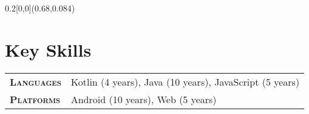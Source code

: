 \documentclass[a4paper, oneside, final]{scrartcl} %
\newcommand{\subSecHeadWidth}{2.1cm}
\begin{document}
\begin{center} %


{\hspace{-3.8cm} \fontsize{34}{34}\selectfont\scshape {\thinfont \myname} {\bodyfont \mysurname}} %

\vspace{1.2cm} %



\begin{textblock}{0.2}[0,0](0.68,0.084)
\begin{flushright}
\end{flushright}
\end{textblock}



\section{Key Skills}

\begin{tabularx}{0.97\linewidth}{>{\raggedleft\scshape}p{\subSecHeadWidth}X}
\textbf{Languages} & Kotlin (4 years), Java (10 years), JavaScript (5 years) \\
\textbf{Platforms} & Android (10 years), Web (5 years) \\
\end{tabularx}


\end{center}
\end{document}
